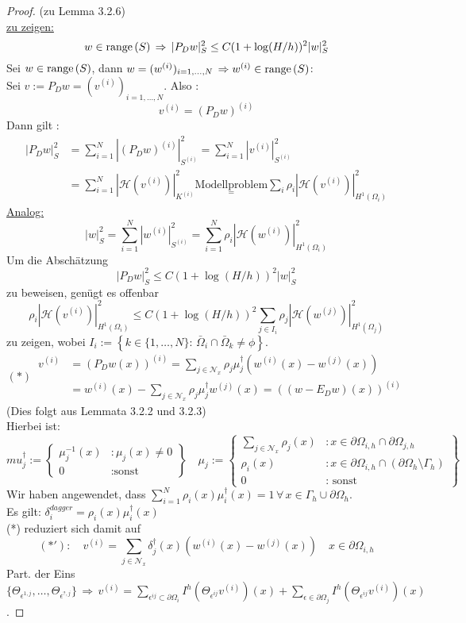 \begin{proof}(zu Lemma 3.2.6)\\
\underline{zu zeigen:} \[ w \in \textnormal{range}\, (S) \, \Rightarrow \, |P_Dw|^2_S \leq C(1+ \log (H/h))^2|w|^2_S \]
Sei $w \in \textnormal{range}\, (S)$, dann $w=(w^{(i)})_{i=1,\dots,N} \, \Rightarrow w^{(i)}\in \textnormal{range}\, (S)$:\\
Sei $v := P_Dw = (v^{(i)})_{i=1,\dots,N}$. Also : \[v^{(i)}= (P_Dw)^{(i)}\]
Dann gilt : 
\begin{align*}
|P_Dw|^2_S &= \sum_{i=1}^N |(P_Dw)^{(i)}|^2_{S^{(i)}} = \sum_{i=1}^N |v^{(i)}|^2_{S^{(i)}} \\
&= \sum_{i=1}^N |\mathcal{H} (v^{(i)})|^2_{K^{(i)}} \underset{=}{\text{Modellproblem}} \sum_i\rho_i |\mathcal{H} (v^{(i)})|^2_{H^1(\Omega_i)}
\end{align*}
\underline{Analog:}
\[|w|^2_S = \sum_{i=1}^N |w^{(i)}|^2_{S^{(i)}} = \sum_{i=1}^N \rho_i |\mathcal{H} (w^{(i)})|^2_{H^1(\Omega_i)} \]
Um die Abschätzung 
\[ |P_Dw|^2_S \leq C(1+\log (H/h))^2 |w|^2_S \]
zu beweisen, genügt es offenbar
\[ \boxed{\rho_i |\mathcal{H} (v^{(i)})|^2_{H^1(\Omega_i)} \leq C(1+\log(H/h))^2 \sum_{j \in I_i} \rho_j |\mathcal{H} (w^{(j)})|^2_{H^1(\Omega_j)}}\]
zu zeigen, wobei $I_i := \left\{ k\in \{1,\dots,N\}: \, \bar{\Omega}_i \cap \bar{\Omega}_k \neq \phi \right\}$.\\
\[(*) \, \begin{aligned}
v^{(i)} &= (P_Dw(x))^{(i)} = \sum_{j \in \mathcal{N}_x} \rho_j \mu^{\dagger}_j (w^{(i)}(x) - w^{(j)}(x)) \\
&= w^{(i)}(x) - \sum_{j \in \mathcal{N}_x}\rho_j \mu^{\dagger}_j w^{(j)}(x) = \left( (w-E_Dw)(x) \right)^{(i)}
\end{aligned} \]
(Dies folgt aus Lemmata 3.2.2 und 3.2.3)\\
Hierbei ist:
\[ mu^{\dagger}_j := \left\{ \begin{aligned} \mu^{-1}_j (x) &: \mu_j(x) \neq 0 \\ 0 &: \text{sonst} \end{aligned} \right\} \quad \mu_j := \left\{ \begin{aligned} \sum_{j \in \mathcal{N}_x} \rho_j(x) &: x \in \partial\Omega_{i,h} \cap \partial \Omega_{j,h} \\ \rho_i (x) &: x \in \partial \Omega_{i,h}\cap (\partial\Omega_h\setminus \Gamma_h ) \\ 0 &: \text{ sonst} \end{aligned} \right\}
\]
Wir haben angewendet, dass $\sum_{i=1}^N \rho_i(x)\mu^{\dagger}_i(x) =1\, \forall \, x\in \Gamma_h \cup \partial\Omega_h$. \\
Es gilt: $\delta^{dagger}_i =\rho_i(x)\mu^{\dagger}_i(x) $ \\
(*) reduziert sich damit auf
\[ (*') :\quad v^{(i)} = \sum_{j \in \mathcal{N}_x} \delta^{\dagger}_j(x) (w^{(i)}(x)-w^{(j)}(x)) \quad x\in \partial \Omega_{i,h} \]
Part. der Eins $\{\Theta_{\epsilon^{1,j}},\dots , \Theta_{\epsilon^{?,j}}\}\, \Rightarrow  \, v^{(i)} = \sum_{\epsilon^{ij} \subset \partial\Omega_i} I^h (\Theta_{\epsilon^{ij}}v^{(i)})(x) + \sum_{\epsilon \in \partial\Omega_j} I^h (\Theta_{\epsilon^{ij}}v^{(i)})(x) $. 

\end{proof}

